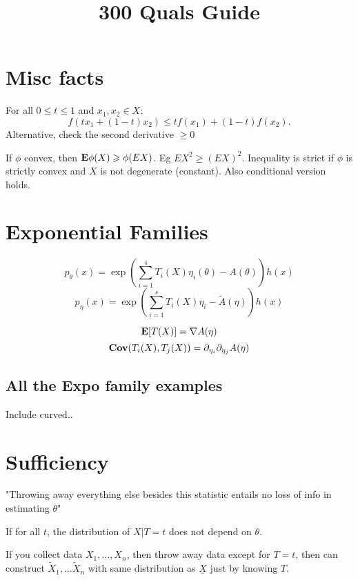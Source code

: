 \documentclass{article}
\title{300 Quals Guide}
\begin{document}
\maketitle
\section{Misc facts}
\begin{definition}[Convexity]
For all $0\leq t\leq 1$ and $x_1,x_2 \in X$:
$$f(tx_1 + (1-t)x_2) \leq tf(x_1) + (1-t) f(x_2).$$
Alternative, check the second derivative $\geq 0$
\end{definition}
\begin{theorem}
If $\phi$ convex, then $\mathbf{E} \phi(X) \geqslant \phi(EX)$. Eg $EX^2 \geq (EX)^2$. Inequality is strict if $\phi$ is strictly convex and $X$ is not degenerate (constant). Also conditional version holds. 
\end{theorem}
\section{Exponential Families}
\begin{definition}
	$$p_\theta(x) = \exp(\sum_{i=1}^s T_i(X) \eta_i(\theta) - A(\theta))h(x)$$
	$$p_\eta(x) = \exp(\sum_{i=1}^s T_i(X) \eta_i - \tilde A(\eta)) h(x)$$
\end{definition}
\begin{fact}
$$\mathbf{E}[T(X)] = \nabla A(\eta)$$
$$\mathbf{Cov} (T_i(X), T_j(X)) = \partial_{\eta_i} \partial_{\eta_j} A(\eta)$$
\end{fact}

\subsection{All the Expo family examples}

Include curved.. 


\section{Sufficiency} 
"Throwing away everything else besides this statistic entails no loss of info in estimating $\theta$"
\begin{definition}[Sufficiency]
If for all $t$, the distribution of $X|T=t$ does not depend on $\theta$.
\end{definition}
If you collect data $X_1,\ldots,X_n$, then throw away data except for $T=t$, then can construct $\tilde X_1,\ldots \tilde X_n$ with same distribution as $\underline{X}$ just by knowing $T$.
\end{document}
